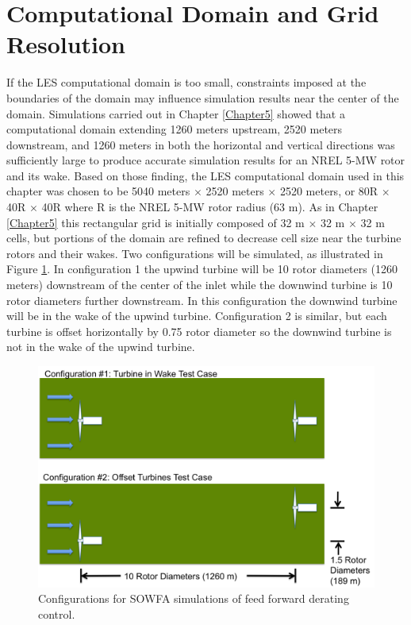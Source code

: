 
\section{Computational Domain and Grid Resolution} \label{section6-3}


If the LES computational domain is too small, constraints imposed at the boundaries of the domain may influence simulation results near the center of the domain. Simulations carried out in Chapter \ref{Chapter5} showed that a computational domain extending 1260 meters upstream, 2520 meters downstream, and 1260 meters in both the horizontal and vertical directions was sufficiently large to produce accurate simulation results for an NREL 5-MW rotor and its wake. Based on those finding, the LES computational domain used in this chapter was chosen to be 5040 meters $\times$ 2520 meters $\times$ 2520 meters, or 80R $\times$ 40R $\times$ 40R where R is the NREL 5-MW rotor radius (63 m). As in Chapter \ref{Chapter5} this rectangular grid is initially composed of 32 m $\times$ 32 m $\times$ 32 m cells, but portions of the domain are refined to decrease cell size near the turbine rotors and their wakes. Two configurations will be simulated, as illustrated in Figure \ref{fig6-1}. In configuration 1 the upwind turbine will be 10 rotor diameters (1260 meters) downstream of the center of the inlet while the downwind turbine is 10 rotor diameters further downstream. In this configuration the downwind turbine will be in the wake of the upwind turbine. Configuration 2 is similar, but each turbine is offset horizontally by 0.75 rotor diameter so the downwind turbine is not in the wake of the upwind turbine. 

\begin{figure}[ht]	
	\centering
		\includegraphics[width = \linewidth]{Figures/ch6Figures/fig6-1.png}
		
	\caption{Configurations for SOWFA simulations of feed forward derating control.}
	\label{fig6-1}
\end{figure}


